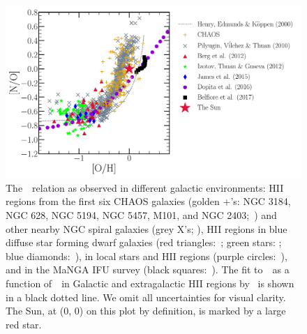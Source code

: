 \documentclass[ms.tex]{subfiles}
\begin{document}
\begin{figure}
\centering
\includegraphics[scale = 0.45]{no_oh_observed.pdf}
\caption{
	The~\ohno~relation as observed in different galactic environments:
	HII regions from the first six CHAOS galaxies (golden +'s: NGC 3184, NGC
	628, NGC 5194, NGC 5457, M101, and NGC 2403;~\citealp{Berg2020,
	Skillman2020, Rogers2021}) and other nearby NGC spiral galaxies (grey X's;
	\citealp{Pilyugin2010}), HII regions in blue diffuse star forming dwarf
	galaxies (red triangles:~\citealp{Berg2012}; green stars:
	\citealp{Izotov2012}; blue diamonds:~\citealp{James2015}), in local stars
	and HII regions (purple circles:~\citealp{Dopita2016}), and in the MaNGA
	IFU survey (black squares:~\citealp{Belfiore2017}).
	The fit to~\no~as a function of~\oh~in Galactic and extragalactic HII
	regions by~\citet{Henry2000} is shown in a black dotted line.
	We omit all uncertainties for visual clarity.
	The Sun, at (0, 0) on this plot by definition, is marked by a large red
	star. 
}
\label{fig:no_oh_observed}
\end{figure}
\end{document}
